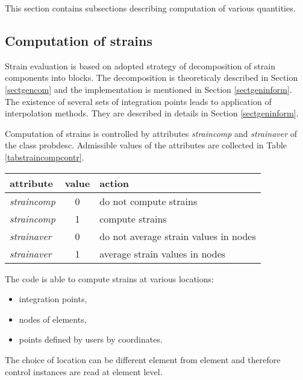 This section contains subsections describing computation of various quantities.

\subsection{Computation of strains}
\label{sectstraincomp}

Strain evaluation is based on adopted strategy of decomposition of strain components
into blocks. The decomposition is theoreticaly described in Section \ref{sectgencom} and the
implementation is mentioned in Section \ref{sectgeninform}. The existence of several sets of
integration points leads to application of interpolation methods. They are described in details
in Section \ref{sectgeninform}.

Computation of strains is controlled by attributes {\it straincomp} and {\it strainaver} of the class
{\sf probdesc}. Admissible values of the attributes are collected in Table \ref{tabstraincompcontr}.

\begin{center}
\begin{tabular}{|l|c|l|}
\hline
attribute & value & action
\\ \hline \hline
{\it straincomp} & 0 & do not compute strains
\\ \hline
{\it straincomp} & 1 & compute strains
\\ \hline \hline
{\it strainaver} & 0 & do not average strain values in nodes
\\ \hline
{\it strainaver} & 1 & average strain values in nodes
\\ \hline
\end{tabular}
\label{tabstraincompcontr}
\end{center}

The code is able to compute strains at various locations:
\begin{itemize}
\item{integration points,}
\item{nodes of elements,}
\item{points defined by users by coordinates.}
\end{itemize}
The choice of location can be different element from element and therefore control instances are read
at element level.

